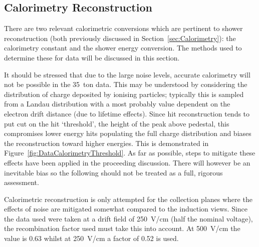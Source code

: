 \subsection{Calorimetry Reconstruction}\label{sec:DataCalorimetryReconstruction}

There are two relevant calorimetric conversions which are pertinent to shower reconstruction (both previously discussed in Section~\ref{sec:Calorimetry}): the calorimetry constant and the shower energy conversion.  The methods used to determine these for data will be discussed in this section.

It should be stressed that due to the large noise levels, accurate calorimetry will not be possible in the 35~ton data.  This may be understood by considering the distribution of charge deposited by ionising particles; typically this is sampled from a Landau distribution with a most probably value dependent on the electron drift distance (due to lifetime effects).  Since hit reconstruction tends to put cut on the hit `threshold', the height of the peak above pedestal, this compromises lower energy hits populating the full charge distribution and biases the reconstruction toward higher energies.  This is demonstrated in Figure~\ref{fig:DataCalorimetryThreshold}.  As far as possible, steps to mitigate these effects have been applied in the proceeding discussion.  There will however be an inevitable bias so the following should not be treated as a full, rigorous assessment.

Calorimetric reconstruction is only attempted for the collection planes where the effects of noise are mitigated somewhat compared to the induction views.  Since the data used were taken at a drift field of 250~V/cm (half the nominal voltage), the recombination factor used must take this into account.  At 500~V/cm the value is 0.63 whilst at 250~V/cm a factor of 0.52 is used.

